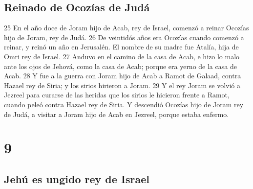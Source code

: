 \section*{Reinado de Ocozías de Judá }

25 En el año doce de Joram hijo de Acab, rey de Israel, comenzó a reinar Ocozías hijo de Joram, rey de Judá. 
26 De veintidós años era Ocozías cuando comenzó a reinar, y reinó un año en Jerusalén. El nombre de su madre fue Atalía, hija de Omri rey de Israel.
27 Anduvo en el camino de la casa de Acab, e hizo lo malo ante los ojos de Jehová, como la casa de Acab; porque era yerno de la casa de Acab.
28 Y fue a la guerra con Joram hijo de Acab a Ramot de Galaad, contra Hazael rey de Siria; y los sirios hirieron a Joram.
29 Y el rey Joram se volvió a Jezreel para curarse de las heridas que los sirios le hicieron frente a Ramot, cuando peleó contra Hazael rey de Siria. Y descendió Ocozías hijo de Joram rey de Judá, a visitar a Joram hijo de Acab en Jezreel, porque estaba enfermo.

\chapter{9}

\section*{Jehú es ungido rey de Israel}

